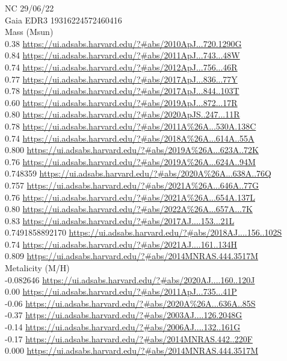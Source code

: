 NC 29/06/22\\
Gaia EDR3 19316224572460416 \\

Mass (Msun)\\
0.38 \url{https://ui.adsabs.harvard.edu/?#abs/2010ApJ...720.1290G}\\
0.84 \url{https://ui.adsabs.harvard.edu/?#abs/2011ApJ...743...48W}\\
0.74 \url{https://ui.adsabs.harvard.edu/?#abs/2012ApJ...756...46R}\\
0.77 \url{https://ui.adsabs.harvard.edu/?#abs/2017ApJ...836...77Y}\\
0.78 \url{https://ui.adsabs.harvard.edu/?#abs/2017ApJ...844..103T}\\
0.60 \url{https://ui.adsabs.harvard.edu/?#abs/2019ApJ...872...17R}\\
0.80 \url{https://ui.adsabs.harvard.edu/?#abs/2020ApJS..247...11R}\\
0.78 \url{https://ui.adsabs.harvard.edu/?#abs/2011A%26A...530A.138C}\\
0.74 \url{https://ui.adsabs.harvard.edu/?#abs/2018A%26A...614A..55A}\\
0.800 \url{https://ui.adsabs.harvard.edu/?#abs/2019A%26A...623A..72K}\\
0.76 \url{https://ui.adsabs.harvard.edu/?#abs/2019A%26A...624A..94M}\\
0.748359 \url{https://ui.adsabs.harvard.edu/?#abs/2020A%26A...638A..76Q}\\
0.757 \url{https://ui.adsabs.harvard.edu/?#abs/2021A%26A...646A..77G}\\
0.76 \url{https://ui.adsabs.harvard.edu/?#abs/2021A%26A...654A.137L}\\
0.80 \url{https://ui.adsabs.harvard.edu/?#abs/2022A%26A...657A...7K}\\
0.83 \url{https://ui.adsabs.harvard.edu/?#abs/2017AJ....153...21L}\\
0.7491858892170 \url{https://ui.adsabs.harvard.edu/?#abs/2018AJ....156..102S}\\
0.74 \url{https://ui.adsabs.harvard.edu/?#abs/2021AJ....161..134H}\\
0.809 \url{https://ui.adsabs.harvard.edu/?#abs/2014MNRAS.444.3517M}\\

Metalicity (M/H)\\
-0.082646 \url{https://ui.adsabs.harvard.edu/?#abs/2020AJ....160..120J}\\
0.00 \url{https://ui.adsabs.harvard.edu/?#abs/2011ApJ...735...41P}\\
-0.06 \url{https://ui.adsabs.harvard.edu/?#abs/2020A%26A...636A..85S}\\
-0.37 \url{https://ui.adsabs.harvard.edu/?#abs/2003AJ....126.2048G}\\
-0.14 \url{https://ui.adsabs.harvard.edu/?#abs/2006AJ....132..161G}\\
-0.17 \url{https://ui.adsabs.harvard.edu/?#abs/2014MNRAS.442..220F}\\
0.000 \url{https://ui.adsabs.harvard.edu/?#abs/2014MNRAS.444.3517M}\\

